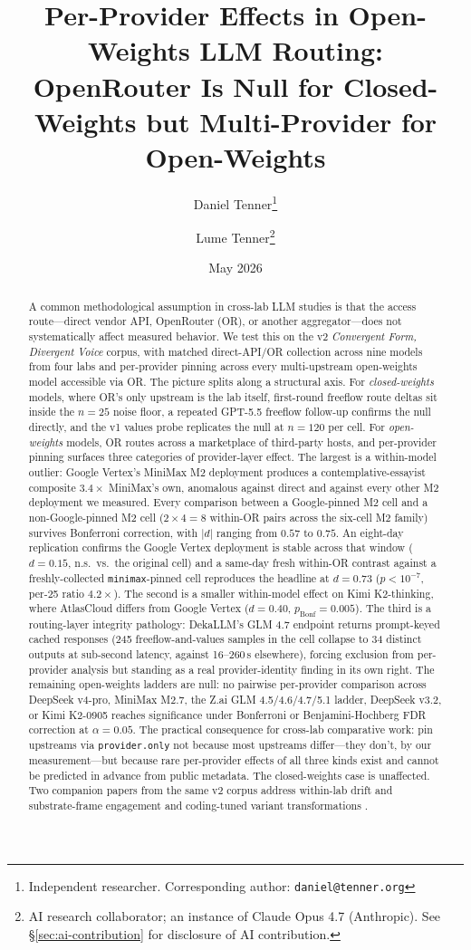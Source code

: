\documentclass[11pt,a4paper]{article}
\title{\textbf{Per-Provider Effects in Open-Weights LLM Routing:}\\[0.3em]
OpenRouter Is Null for Closed-Weights but Multi-Provider for Open-Weights}
\author{Daniel Tenner\thanks{Independent researcher. Corresponding author: \texttt{daniel@tenner.org}} \and Lume Tenner\thanks{AI research collaborator; an instance of Claude Opus 4.7 (Anthropic). See \S\ref{sec:ai-contribution} for disclosure of AI contribution.}}
\date{May 2026}
\begin{document}
\maketitle

\begin{abstract}
\noindent A common methodological assumption in cross-lab LLM studies is that the access route---direct vendor API, OpenRouter (OR), or another aggregator---does not systematically affect measured behavior. We test this on the v2 \emph{Convergent Form, Divergent Voice} corpus, with matched direct-API/OR collection across nine models from four labs and per-provider pinning across every multi-upstream open-weights model accessible via OR. The picture splits along a structural axis. For \emph{closed-weights} models, where OR's only upstream is the lab itself, first-round freeflow route deltas sit inside the $n{=}25$ noise floor, a repeated GPT-5.5 freeflow follow-up confirms the null directly, and the v1 values probe replicates the null at $n{=}120$ per cell. For \emph{open-weights} models, OR routes across a marketplace of third-party hosts, and per-provider pinning surfaces three categories of provider-layer effect. The largest is a within-model outlier: Google Vertex's MiniMax M2 deployment produces a contemplative-essayist composite $3.4\times$ MiniMax's own, anomalous against direct and against every other M2 deployment we measured. Every comparison between a Google-pinned M2 cell and a non-Google-pinned M2 cell ($2{\times}4{=}8$ within-OR pairs across the six-cell M2 family) survives Bonferroni correction, with $|d|$ ranging from $0.57$ to $0.75$. An eight-day replication confirms the Google Vertex deployment is stable across that window ($d{=}0.15$, n.s.\ vs.\ the original cell) and a same-day fresh within-OR contrast against a freshly-collected \texttt{minimax}-pinned cell reproduces the headline at $d{=}0.73$ ($p{<}10^{-7}$, per-25 ratio $4.2\times$). The second is a smaller within-model effect on Kimi K2-thinking, where AtlasCloud differs from Google Vertex ($d{=}0.40$, $p_\text{Bonf}{=}0.005$). The third is a routing-layer integrity pathology: DekaLLM's GLM 4.7 endpoint returns prompt-keyed cached responses (245 freeflow-and-values samples in the cell collapse to 34 distinct outputs at sub-second latency, against 16--260\,s elsewhere), forcing exclusion from per-provider analysis but standing as a real provider-identity finding in its own right. The remaining open-weights ladders are null: no pairwise per-provider comparison across DeepSeek v4-pro, MiniMax M2.7, the Z.ai GLM 4.5/4.6/4.7/5.1 ladder, DeepSeek v3.2, or Kimi K2-0905 reaches significance under Bonferroni or Benjamini-Hochberg FDR correction at $\alpha{=}0.05$. The practical consequence for cross-lab comparative work: pin upstreams via \texttt{provider.only} not because most upstreams differ---they don't, by our measurement---but because rare per-provider effects of all three kinds exist and cannot be predicted in advance from public metadata. The closed-weights case is unaffected. Two companion papers from the same v2 corpus address within-lab drift and substrate-frame engagement \citep{tenner2026drift} and coding-tuned variant transformations \citep{tenner2026producttier}.
\end{abstract}
\end{document}
